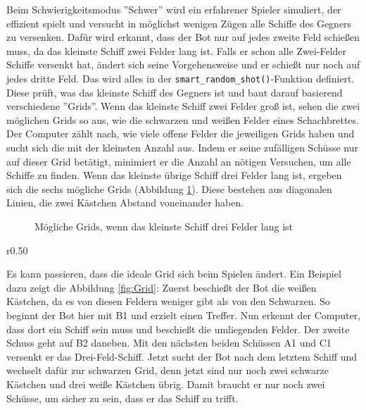 \documentclass{article}
\begin{document}
\par
    Beim Schwierigkeitsmodus ''Schwer'' wird ein erfahrener Spieler simuliert, der effizient spielt und versucht in möglichst wenigen Zügen alle Schiffe des Gegners zu versenken. Dafür wird erkannt, dass der Bot nur auf jedes zweite Feld schießen muss, da das kleinste Schiff zwei Felder lang ist. Falls er schon alle Zwei-Felder Schiffe versenkt hat, ändert sich seine Vorgehensweise und er schießt nur noch auf jedes dritte Feld. Das wird alles in der \verb$smart_random_shot()$-Funktion definiert. Diese prüft, was das kleinste Schiff des Gegners ist und baut darauf basierend verschiedene ''Grids''. Wenn das kleinste Schiff zwei Felder groß ist, sehen die zwei möglichen Grids so aus, wie die schwarzen und weißen Felder eines Schachbrettes. Der Computer zählt nach, wie viele offene Felder die jeweiligen Grids haben und sucht sich die mit der kleinsten Anzahl aus. Indem er seine zufälligen Schüsse nur auf dieser Grid betätigt, minimiert er die Anzahl an nötigen Versuchen, um alle Schiffe zu finden. Wenn das kleinste übrige Schiff drei Felder lang ist, ergeben sich die sechs mögliche Grids (Abbildung \ref{fig:3 field ship grids}). Diese bestehen aus diagonalen Linien, die zwei Kästchen Abstand voneinander haben.

\begin{figure}[H]
    \centering
    
    \caption{Mögliche Grids, wenn das kleinste Schiff drei Felder lang ist}
    \label{fig:3 field ship grids}
\end{figure}

\begin{wrapfigure}{r}{0.50\textwidth}
    \centering
    
    \caption{Beispiel eines Grid-Wechsels}
    \label{fig:Grid}
\end{wrapfigure}

\par
    Es kann passieren, dass die ideale Grid sich beim Spielen ändert. Ein Beispiel dazu zeigt die Abbildung \ref{fig:Grid}: Zuerst beschießt der Bot die weißen Kästchen, da es von diesen Feldern weniger gibt als von den Schwarzen. So beginnt der Bot hier mit B1 und erzielt einen Treffer. Nun erkennt der Computer, dass dort ein Schiff sein muss und beschießt die umliegenden Felder. Der zweite Schuss geht auf B2 daneben. Mit den nächsten beiden Schüssen A1 und C1 versenkt er das Drei-Feld-Schiff. Jetzt sucht der Bot nach dem letztem Schiff und wechselt dafür zur schwarzen Grid, denn jetzt sind nur noch zwei schwarze Kästchen und drei weiße Kästchen übrig. Damit braucht er nur noch zwei Schüsse, um sicher zu sein, dass er das Schiff zu trifft.\\
\end{document}
